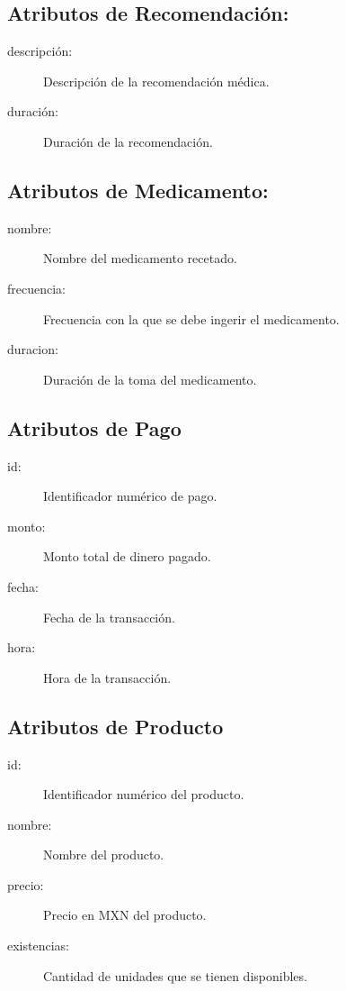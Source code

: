 \subsection{Atributos de Recomendación:}
\begin{description}
\item[descripción: ]Descripción de la recomendación médica.
\item[duración: ]Duración de la recomendación.
\end{description}

\subsection{Atributos de Medicamento:}
\begin{description}
\item[nombre: ]Nombre del medicamento recetado.
\item[frecuencia: ]Frecuencia con la que se debe ingerir el medicamento.
\item[duracion: ]Duración de la toma del medicamento.
\end{description}

\subsection{Atributos de Pago}
\begin{description}
\item[id: ]Identificador numérico de pago.
\item[monto: ]Monto total de dinero pagado.
\item[fecha: ]Fecha de la transacción.
\item[hora: ]Hora de la transacción.
\end{description}

\subsection{Atributos de Producto}
\begin{description}
\item[id: ]Identificador numérico del producto.
\item[nombre: ]Nombre del producto.
\item[precio: ]Precio en MXN del producto.
\item[existencias: ]Cantidad de unidades que se tienen disponibles.
\end{description}

